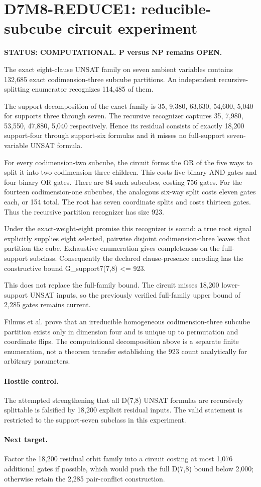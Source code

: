 \section*{D7M8-REDUCE1: reducible-subcube circuit experiment}

\textbf{STATUS: COMPUTATIONAL. P versus NP remains OPEN.}

The exact eight-clause UNSAT family on seven ambient variables contains 132,685 exact codimension-three subcube partitions. An independent recursive-splitting enumerator recognizes 114,485 of them.

The support decomposition of the exact family is 35, 9,380, 63,630, 54,600, 5,040 for supports three through seven. The recursive recognizer captures 35, 7,980, 53,550, 47,880, 5,040 respectively. Hence its residual consists of exactly 18,200 support-four through support-six formulas and it misses no full-support seven-variable UNSAT formula.

For every codimension-two subcube, the circuit forms the OR of the five ways to split it into two codimension-three children. This costs five binary AND gates and four binary OR gates. There are 84 such subcubes, costing 756 gates. For the fourteen codimension-one subcubes, the analogous six-way split costs eleven gates each, or 154 total. The root has seven coordinate splits and costs thirteen gates. Thus the recursive partition recognizer has size 923.

Under the exact-weight-eight promise this recognizer is sound: a true root signal explicitly supplies eight selected, pairwise disjoint codimension-three leaves that partition the cube. Exhaustive enumeration gives completeness on the full-support subclass. Consequently the declared clause-presence encoding has the constructive bound G_support7(7,8) <= 923.

This does not replace the full-family bound. The circuit misses 18,200 lower-support UNSAT inputs, so the previously verified full-family upper bound of 2,285 gates remains current.

Filmus et al. prove that an irreducible homogeneous codimension-three subcube partition exists only in dimension four and is unique up to permutation and coordinate flips. The computational decomposition above is a separate finite enumeration, not a theorem transfer establishing the 923 count analytically for arbitrary parameters.

\paragraph{Hostile control.} The attempted strengthening that all D(7,8) UNSAT formulas are recursively splittable is falsified by 18,200 explicit residual inputs. The valid statement is restricted to the support-seven subclass in this experiment.

\paragraph{Next target.} Factor the 18,200 residual orbit family into a circuit costing at most 1,076 additional gates if possible, which would push the full D(7,8) bound below 2,000; otherwise retain the 2,285 pair-conflict construction.

